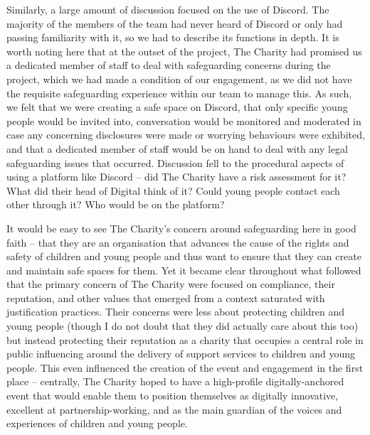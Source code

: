 Similarly, a large amount of discussion focused on the use of Discord. The majority of the members of the team had never heard of Discord or only had passing familiarity with it, so we had to describe its functions in depth. It is worth noting here that at the outset of the project, The Charity had promised us a dedicated member of staff to deal with safeguarding concerns during the project, which we had made a condition of our engagement, as we did not have the requisite safeguarding experience within our team to manage this.  As such, we felt that we were creating a safe space on Discord, that only specific young people would be invited into, conversation would be monitored and moderated in case any concerning disclosures were made or worrying behaviours were exhibited, and that a dedicated member of staff would be on hand to deal with any legal safeguarding issues that occurred. Discussion fell to the procedural aspects of using a platform like Discord – did The Charity have a risk assessment for it? What did their head of Digital think of it? Could young people contact each other through it? Who would be on the platform?

It would be easy to see The Charity’s concern around safeguarding here in good faith – that they are an organisation that advances the cause of the rights and safety of children and young people and thus want to ensure that they can create and maintain safe spaces for them. Yet it became clear throughout what followed that the primary concern of The Charity were focused on compliance, their reputation, and other values that emerged from a context saturated with justification practices. Their concerns were less about protecting children and young people (though I do not doubt that they did actually care about this too) but instead protecting their reputation as a charity that occupies a central role in public influencing around the delivery of support services to children and young people. This even influenced the creation of the event and engagement in the first place – centrally, The Charity hoped to have a high-profile digitally-anchored event that would enable them to position themselves as digitally innovative, excellent at partnership-working, and as the main guardian of the voices and experiences of children and young people.

